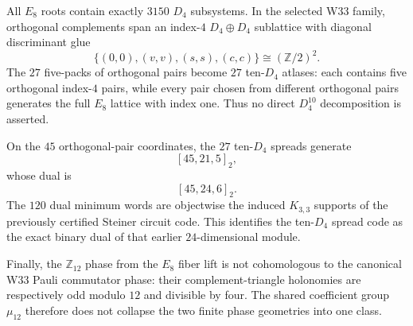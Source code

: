 All $E_8$ roots contain exactly $3150$ $D_4$ subsystems.  In the selected W33 family, orthogonal complements span an index-$4$ $D_4\oplus D_4$ sublattice with diagonal discriminant glue
\[
 \boxed{\{(0,0),(v,v),(s,s),(c,c)\}\cong(\mathbb Z/2)^2}.
\]
The $27$ five-packs of orthogonal pairs become $27$ ten-$D_4$ atlases: each contains five orthogonal index-$4$ pairs, while every pair chosen from different orthogonal pairs generates the full $E_8$ lattice with index one.  Thus no direct $D_4^{10}$ decomposition is asserted.

On the $45$ orthogonal-pair coordinates, the $27$ ten-$D_4$ spreads generate
\[
 \boxed{[45,21,5]_2},
\]
whose dual is
\[
 \boxed{[45,24,6]_2}.
\]
The $120$ dual minimum words are objectwise the induced $K_{3,3}$ supports of the previously certified Steiner circuit code.  This identifies the ten-$D_4$ spread code as the exact binary dual of that earlier $24$-dimensional module.

Finally, the $\mathbb Z_{12}$ phase from the $E_8$ fiber lift is not cohomologous to the canonical W33 Pauli commutator phase: their complement-triangle holonomies are respectively odd modulo $12$ and divisible by four.  The shared coefficient group $\mu_{12}$ therefore does not collapse the two finite phase geometries into one class.
